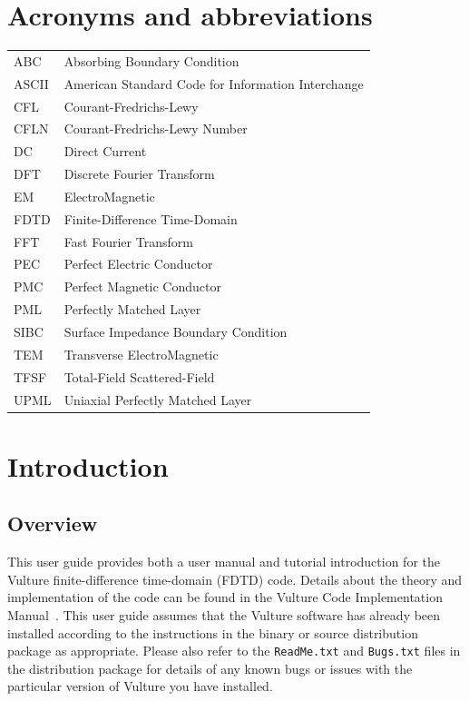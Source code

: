 \documentclass[onecolumn,a4paper]{article}
\numberwithin{equation}{section}
\begin{document}
\section*{Acronyms and abbreviations}
\pagestyle{fancy}
%
%
{\large
\begin{tabular}{l@{\hspace{15mm}}l}
  ABC        &Absorbing Boundary Condition \\
  ASCII      &American Standard Code for Information Interchange \\
  CFL        &Courant-Fredrichs-Lewy \\
  CFLN       &Courant-Fredrichs-Lewy Number \\
  DC         &Direct Current \\
  DFT        &Discrete Fourier Transform \\
  EM         &ElectroMagnetic \\
  FDTD       &Finite-Difference Time-Domain \\
  FFT        &Fast Fourier Transform \\
  PEC        &Perfect Electric Conductor \\
  PMC        &Perfect Magnetic Conductor \\
  PML        &Perfectly Matched Layer \\
  SIBC       &Surface Impedance Boundary Condition \\
  TEM        &Transverse ElectroMagnetic \\
  TFSF       &Total-Field Scattered-Field \\
  UPML       &Uniaxial Perfectly Matched Layer
\end{tabular}
}%
%
%
%
\newpage
%
%
\section{Introduction}         
%
%

\subsection{Overview}

This user guide provides both a user manual and tutorial introduction
for the Vulture finite-difference time-domain (FDTD) code. Details about the theory 
and implementation of the code can be found in the Vulture Code Implementation 
Manual~\cite{vultimp}. This user guide assumes that the Vulture software has already been 
installed according to the instructions in the binary or source distribution package 
as appropriate. Please also refer to the \texttt{ReadMe.txt} and \texttt{Bugs.txt} files in the 
distribution package for details of any known bugs or issues with the particular 
version of Vulture you have installed.
\end{document}
